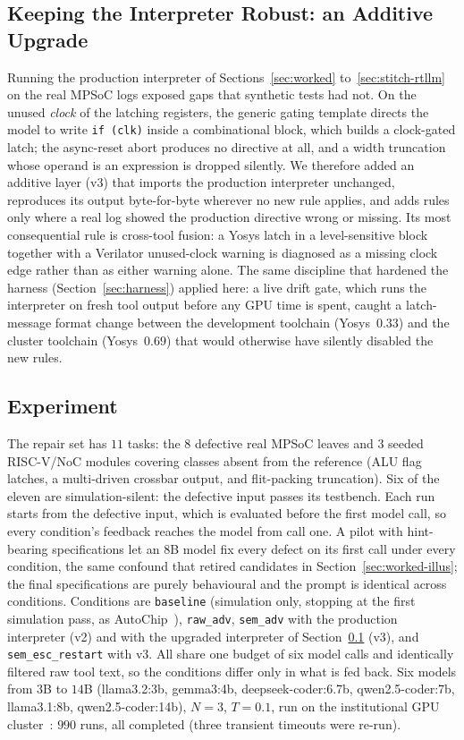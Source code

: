 \documentclass[11pt]{article}
\begin{document}
\subsection{Keeping the Interpreter Robust: an Additive Upgrade}
\label{sec:mpsoc-v3}

Running the production interpreter of Sections~\ref{sec:worked}
to~\ref{sec:stitch-rtllm} on the real MPSoC logs exposed gaps that synthetic
tests had not. On the unused \emph{clock} of the latching registers, the
generic gating template directs the model to write \texttt{if (clk)} inside a
combinational block, which builds a clock-gated latch; the async-reset abort
produces no directive at all, and a width truncation whose operand is an
expression is dropped silently. We therefore added an additive layer (v3) that
imports the production interpreter unchanged, reproduces its output
byte-for-byte wherever no new rule applies, and adds rules only where a real
log showed the production directive wrong or missing. Its most consequential
rule is cross-tool fusion: a Yosys latch in a level-sensitive block together
with a Verilator unused-clock warning is diagnosed as a missing clock edge
rather than as either warning alone. The same discipline that hardened the
harness (Section~\ref{sec:harness}) applied here: a live drift gate, which runs
the interpreter on fresh tool output before any GPU time is spent, caught a
latch-message format change between the development toolchain (Yosys~$0.33$)
and the cluster toolchain (Yosys~$0.69$) that would otherwise have silently
disabled the new rules.

\subsection{Experiment}
\label{sec:mpsoc-exp}

The repair set has $11$ tasks: the $8$ defective real MPSoC leaves and $3$
seeded RISC-V/NoC modules covering classes absent from the reference (ALU flag
latches, a multi-driven crossbar output, and flit-packing truncation). Six of
the eleven are simulation-silent: the defective input passes its testbench.
Each run starts from the defective input, which is evaluated before the first
model call, so every condition's feedback reaches the model from call one. A
pilot with hint-bearing specifications let an $8$B model fix every defect on
its first call under every condition, the same confound that retired
candidates in Section~\ref{sec:worked-illus}; the final specifications are
purely behavioural and the prompt is identical across conditions.
Conditions are \texttt{baseline} (simulation only, stopping at the first
simulation pass, as AutoChip~\cite{autochip}), \texttt{raw\_adv},
\texttt{sem\_adv} with the production interpreter (v2) and with the upgraded
interpreter of Section~\ref{sec:mpsoc-v3} (v3), and \texttt{sem\_esc\_restart}
with v3. All share one budget of six model calls and identically filtered raw
tool text, so the conditions differ only in what is fed back. Six models from
$3$B to $14$B (llama3.2:3b, gemma3:4b, deepseek-coder:6.7b, qwen2.5-coder:7b,
llama3.1:8b, qwen2.5-coder:14b), $N{=}3$, $T{=}0.1$, run on the institutional
GPU cluster~\cite{bitshpc}: $990$ runs, all completed (three transient
timeouts were re-run).
\end{document}
